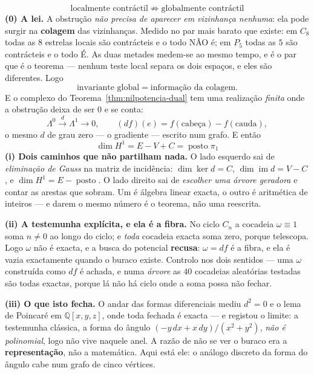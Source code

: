 \documentclass[livro.tex]{subfiles}
\begin{document}
\begin{teorema}\label{thm:ponte-cohomologia}
\[
\boxed{\;\text{localmente contráctil}\;\not\Longrightarrow\;
\text{globalmente contráctil}\;}
\]
\textbf{(0) A lei.} A obstrução \emph{não precisa de aparecer em
vizinhança nenhuma}: ela pode surgir na \textbf{colagem} das
vizinhanças. Medido no par mais barato que existe: em $C_{8}$ todas as
$8$ estrelas locais são contrácteis e o todo NÃO é; em $P_{5}$ todas as
$5$ são contrácteis e o todo É. As duas metades medem-se ao mesmo
tempo, e é o par que é o teorema --- nenhum teste local separa os dois
espaços, e eles são diferentes. Logo
\[
\boxed{\;\text{invariante global}=\text{informação da colagem}.\;}
\]
E o complexo do Teorema~\ref{thm:nilpotencia-dual} tem uma realização
\emph{finita} onde a obstrução deixa de ser $0$ e se conta:
\[
\Lambda^{0}\xrightarrow{\;d\;}\Lambda^{1}\to 0,
\qquad
(df)(e)=f(\text{cabeça})-f(\text{cauda}),
\]
o mesmo $d$ de grau zero --- o gradiente --- escrito num grafo. E então
\[
\boxed{\;
\dim H^{1}=E-V+C=\operatorname{posto}\pi_{1}\;}
\]
\textbf{(i) Dois caminhos que não partilham nada.} O lado esquerdo sai
de \emph{eliminação de Gauss} na matriz de incidência: $\dim\ker d=C$,
$\dim\operatorname{im}d=V-C$, e $\dim H^{1}=E-\operatorname{posto}$. O
lado direito sai de \emph{escolher uma árvore geradora} e contar as
arestas que sobram. Um é álgebra linear exacta, o outro é aritmética de
inteiros --- e darem o mesmo número é o teorema, não uma reescrita.

\textbf{(ii) A testemunha explícita, e ela é a fibra.} No ciclo $C_{n}$
a cocadeia $\omega\equiv1$ soma $n\neq0$ ao longo do ciclo; e \emph{toda}
cocadeia exacta soma zero, porque telescopa. Logo $\omega$ não é exacta,
e a busca do potencial \textbf{recusa}: $\omega=df$ é a fibra, e ela é
vazia exactamente quando o buraco existe. Controlo nos dois sentidos ---
uma $\omega$ construída como $df$ é achada, e numa \emph{árvore} as $40$
cocadeias aleatórias testadas são todas exactas, porque lá não há ciclo
onde a soma possa não fechar.

\textbf{(iii) O que isto fecha.} O andar das formas diferenciais
mediu $d^{2}=0$ e o lema de Poincaré em $\mathbb{Q}[x,y,z]$, onde toda
fechada é exacta --- e registou o limite: a testemunha clássica, a forma
do ângulo $(-y\,dx+x\,dy)/(x^{2}+y^{2})$, \emph{não é polinomial}, logo
não vive naquele anel. A razão de não se ver o buraco era a
\textbf{representação}, não a matemática. Aqui está ele: o análogo
discreto da forma do ângulo cabe num grafo de cinco vértices.


\end{teorema}
\end{document}
